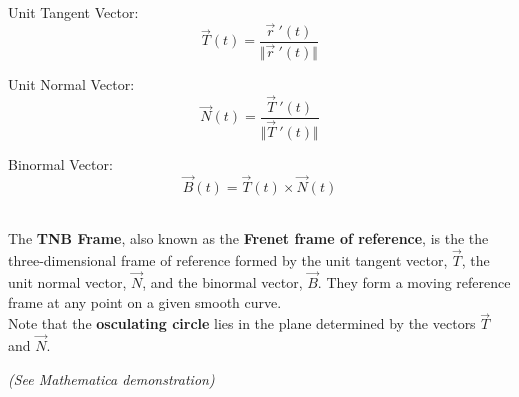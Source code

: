\hspace*{-.5in}

Unit Tangent Vector:
\[
\vec{T}(t) = \frac{\vec{r}\ '(t)}{\Vert\vec{r}\ '(t)\Vert} 
\]

Unit Normal Vector:
\[
\vec{N}(t) = \frac{\vec{T}\ '(t)}{\Vert\vec{T}\ '(t)\Vert} 
\]

Binormal Vector:
\[
\vec{B}(t) = \vec{T}(t) \times \vec{N}(t)
\]


~\\
The \textbf{TNB Frame}, also known as the \textbf{Frenet frame of reference}, is the the three-dimensional frame of reference formed by the unit tangent vector, \(\vec{T}\), the unit normal vector, \(\vec{N}\), and the binormal vector, \(\vec{B}\). They form a moving reference frame at any point on a given smooth curve.\\

Note that the \textbf{osculating circle} lies in the plane determined by the vectors \(\vec{T}\) and \(\vec{N}\).



\begin{flushright}
\textit{(See Mathematica demonstration)}
\end{flushright}

%
%
%
%
%
%
%
%


